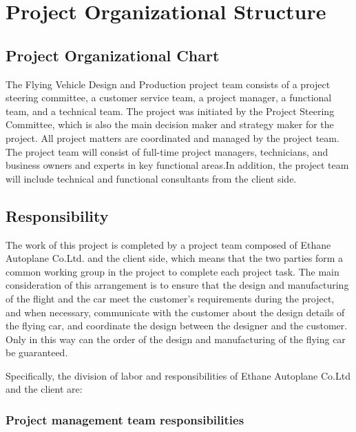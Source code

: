 \chapter{Project Organizational Structure}

\section{Project Organizational Chart}

The Flying Vehicle Design and Production project team consists of a project steering committee, a customer service team, a project manager, a functional team, and a technical team. The project was initiated by the Project Steering Committee, which is also the main decision maker and strategy maker for the project. All project matters are coordinated and managed by the project team. The project team will consist of full-time project managers, technicians, and business owners and experts in key functional areas.In addition, the project team will include technical and functional consultants from the client side.

{\color{red}{插图}}

\section{Responsibility}

The work of this project is completed by a project team composed of Ethane Autoplane Co.Ltd. and the client side, which means that the two parties form a common working group in the project to complete each project task. The main consideration of this arrangement is to ensure that the design and manufacturing of the flight and the car meet the customer's requirements during the project, and when necessary, communicate with the customer about the design details of the flying car, and coordinate the design between the designer and the customer. Only in this way can the order of the design and manufacturing of the flying car be guaranteed.

Specifically, the division of labor and responsibilities of Ethane Autoplane Co.Ltd and the client are:

\subsection{Project management team responsibilities}

